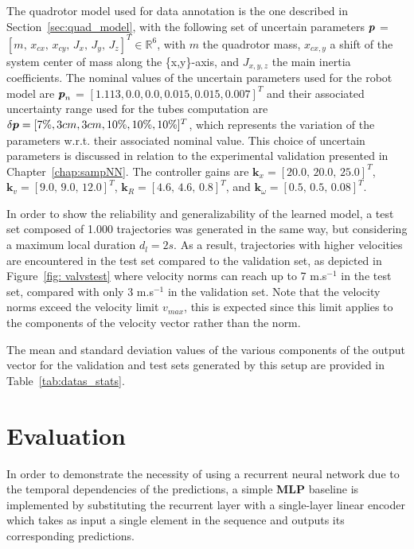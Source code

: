 The quadrotor model used for data annotation is the one described in Section~\ref{sec:quad_model}, with the following set of uncertain parameters $\boldsymbol{p}$ = $[m, \, \allowbreak x_{cx}, \, \allowbreak x_{cy}, \, \allowbreak J_{x}, \, \allowbreak J_{y}, \,\allowbreak J_{z}]^T \in \mathbb{R}^{6}$, with $m$ the quadrotor mass, $x_{cx,y}$ a shift of the system center of mass along the \{x,y\}-axis, and $J_{x,y,z}$ the main inertia coefficients.
The nominal values of the uncertain parameters used for the robot model are $\boldsymbol{p}_{n}$ = $[1.113, \allowbreak0.0, \allowbreak0.0, \allowbreak0.015, \allowbreak0.015, \allowbreak0.007]^T$ and their associated uncertainty range used for the tubes computation are $\delta\boldsymbol{p} = [7\%, \allowbreak3cm, \allowbreak3cm, \allowbreak10\%, \allowbreak10\%, \allowbreak10\%]^T$, which represents the variation of the parameters w.r.t. their associated nominal value.
This choice of uncertain parameters is discussed in relation to the experimental validation presented in Chapter~\ref{chap:sampNN}.
The controller gains are $\boldsymbol{k}_{x} = [20.0, \, 20.0, \, 25.0]^T$, $\boldsymbol{k}_{v}= [9.0, \, 9.0, \, 12.0]^T$, $\boldsymbol{k}_{R}=[4.6, \, 4.6, \, 0.8]^T$, and $\boldsymbol{k}_{\omega}=[0.5, \, 0.5, \, 0.08]^T$.

In order to show the reliability and generalizability of the learned model, a test set composed of 1.000 trajectories was generated in the same way, but considering a maximum local duration $d_l = 2s$.
As a result, trajectories with higher velocities are encountered in the test set compared to the validation set, as depicted in Figure~\ref{fig: valvstest} where velocity norms can reach up to 7 m.s$^{-1}$ in the test set, compared with only 3 m.s$^{-1}$ in the validation set.
Note that the velocity norms exceed the velocity limit $v_{max}$, this is expected since this limit applies to the components of the velocity vector rather than the norm.

The mean and standard deviation values of the various components of the output vector for the validation and test sets generated by this setup are provided in Table~\ref{tab:datas_stats}.

\section{Evaluation}\label{sec:nn_eval}

In order to demonstrate the necessity of using a recurrent neural network due to the temporal dependencies of the predictions, a simple \textbf{MLP} baseline is implemented by substituting the recurrent layer with a single-layer linear encoder which takes as input a single element in the sequence and outputs its corresponding predictions.

